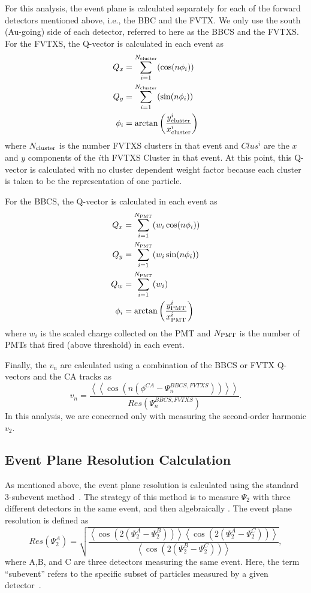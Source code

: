For this analysis, the event plane is calculated separately for each of the forward detectors mentioned above, i.e., the BBC and the FVTX. We only use the south (Au-going) side of each detector, referred to here as the BBCS and the FVTXS.
For the FVTXS, the Q-vector is calculated in each event as
\begin{align}
Q_x &= \sum^{N_{\rm cluster}}_{i=1}( \cos(n\phi_i)) \\
Q_y &= \sum^{N_{\rm cluster}}_{i=1}( \sin(n\phi_i)) \\
\phi_i &= \arctan\left(\frac{y^i_{\rm cluster}}{x^i_{\rm cluster}}\right)
\end{align}
where $N_{\rm cluster}$ is the number FVTXS clusters in that event and $Clus^i$ are the $x$ and $y$ components of the $i$th FVTXS Cluster in that event. At this point, this Q-vector is calculated with no cluster dependent weight factor because each cluster is taken to be the representation of one particle.

For the BBCS, the Q-vector is calculated in each event as
\begin{align}
Q_x &= \sum^{N_{\rm PMT}}_{i=1}( w_i \cos(n\phi_i)) \\
Q_y &= \sum^{N_{\rm PMT}}_{i=1}( w_i \sin(n\phi_i)) \\
Q_w &= \sum^{N_{\rm PMT}}_{i=1}( w_i ) \\
\phi_i &= \arctan\left(\frac{y^i_{\rm PMT}}{x^i_{\rm PMT}}\right) 
\label{eqn:bbc_ep_eqns}
\end{align}
where $w_i$ is the scaled charge collected on the PMT and $N_{\rm PMT}$ is the number of PMTs that fired (above threshold) in each event.

Finally, the $v_n$ are calculated using a combination of the BBCS or FVTX Q-vectors and the CA tracks as
\begin{equation}
v_n = \frac{\left<\left<\cos(n(\phi^{CA} - \Psi^{BBCS,FVTXS}_n))\right>\right>}{Res(\Psi^{BBCS,FVTXS}_n)}.
\end{equation}
In this analysis, we are concerned only with measuring the second-order harmonic $v_2$.

\subsection{Event Plane Resolution Calculation}%
As mentioned above, the event plane resolution is calculated using the standard 3-subevent method~\cite{PhysRevC.58.1671}. The strategy of this method is to measure $\Psi_2$ with three different detectors in the same event, and then algebraically . The event plane resolution is defined as
\begin{equation}
Res(\Psi_2^A) = \sqrt{\frac{\left<\cos(2(\Psi_2^A - \Psi_2^B))\right>\left<\cos(2(\Psi_2^A - \Psi_2^C))\right>}{\left<\cos(2(\Psi_2^B - \Psi_2^C))\right>}},
\label{eqn:res}
\end{equation}
where A,B, and C are three detectors measuring the same event. Here, the term ``subevent'' refers to the specific subset of particles measured by a given detector~\cite{PhysRevC.58.1671}.

